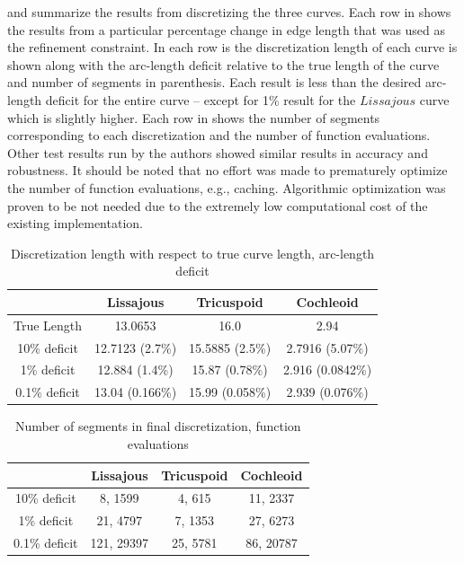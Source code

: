  and  summarize the results from discretizing the three curves. 
Each row in  shows the results from a particular percentage change in edge length that was 
used as the refinement constraint. In each row is the discretization length of each curve is shown along with the arc-length deficit relative to the true length of the curve and number of segments in parenthesis. Each result is less than the desired arc-length deficit for the entire curve -- except for 1\% result for the $Lissajous$ curve which is slightly higher. Each row in  shows the number of segments corresponding to each discretization and the number of function evaluations. Other test results run by the authors showed similar results in accuracy and robustness. It should be noted that no effort was made to prematurely optimize the number of function evaluations, e.g., caching. Algorithmic optimization was proven to be not needed due to the extremely low computational cost of the existing implementation.

\begin{table}[h!] \caption{\label{tab:curvelength} Discretization length with respect to true curve length, arc-length deficit }
\centering
\begin{tabular}{|c|c|c|c|}
\hline
 & Lissajous & Tricuspoid & Cochleoid \\
\hline
True Length & 13.0653 & 16.0 & 2.94\\
10\% deficit & 12.7123 (2.7\%) & 15.5885 (2.5\%) & 2.7916 (5.07\%)\\
1\% deficit & 12.884 (1.4\%) & 15.87 (0.78\%) & 2.916 (0.0842\%)\\
0.1\% deficit & 13.04 (0.166\%) & 15.99 (0.058\%) & 2.939 (0.076\%)\\
\hline
\end{tabular}
\end{table}

\begin{table}[h!] \caption{\label{tab:generationdata} Number of segments in final discretization, function evaluations }
\centering
\begin{tabular}{|c|c|c|c|}
\hline
 & Lissajous & Tricuspoid & Cochleoid \\
\hline
10\% deficit & 8, 1599 & 4, 615 & 11, 2337 \\
1\% deficit & 21, 4797 & 7, 1353 & 27, 6273 \\ 
0.1\% deficit & 121, 29397 & 25, 5781 & 86, 20787 \\ 
\hline
\end{tabular}
\end{table}
